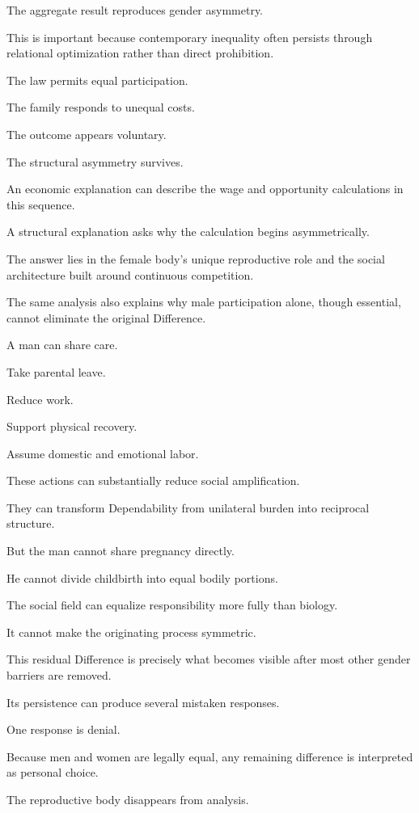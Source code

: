 The aggregate result reproduces gender asymmetry.

This is important because contemporary inequality often persists through relational optimization rather than direct prohibition.

The law permits equal participation.

The family responds to unequal costs.

The outcome appears voluntary.

The structural asymmetry survives.

An economic explanation can describe the wage and opportunity calculations in this sequence.

A structural explanation asks why the calculation begins asymmetrically.

The answer lies in the female body’s unique reproductive role and the social architecture built around continuous competition.

The same analysis also explains why male participation alone, though essential, cannot eliminate the original Difference.

A man can share care.

Take parental leave.

Reduce work.

Support physical recovery.

Assume domestic and emotional labor.

These actions can substantially reduce social amplification.

They can transform Dependability from unilateral burden into reciprocal structure.

But the man cannot share pregnancy directly.

He cannot divide childbirth into equal bodily portions.

The social field can equalize responsibility more fully than biology.

It cannot make the originating process symmetric.

This residual Difference is precisely what becomes visible after most other gender barriers are removed.

Its persistence can produce several mistaken responses.

One response is denial.

Because men and women are legally equal, any remaining difference is interpreted as personal choice.

The reproductive body disappears from analysis.

